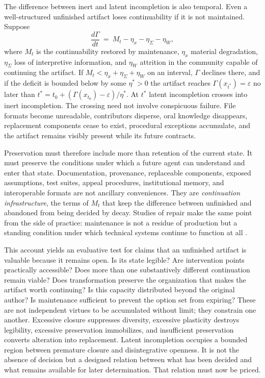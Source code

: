 The difference between inert and latent incompletion is also temporal. Even a well-structured unfinished artifact loses continuability if it is not maintained. Suppose
\begin{equation}\label{eq:decay}
\frac{d\Gamma}{dt}\ =\ M_t-\eta_x-\eta_\Sigma-\eta_W,
\end{equation}
where $M_t$ is the continuability restored by maintenance, $\eta_x$ material degradation, $\eta_\Sigma$ loss of interpretive information, and $\eta_W$ attrition in the community capable of continuing the artifact. If $M_t<\eta_x+\eta_\Sigma+\eta_W$ on an interval, $\Gamma$ declines there, and if the deficit is bounded below by some $\eta^\ast>0$ the artifact reaches $\Gamma(x_{t^\ast})=\varepsilon$ no later than $t^\ast=t_0+(\Gamma(x_{t_0})-\varepsilon)/\eta^\ast$. At $t^\ast$ latent incompletion crosses into inert incompletion. The crossing need not involve conspicuous failure. File formats become unreadable, contributors disperse, oral knowledge disappears, replacement components cease to exist, procedural exceptions accumulate, and the artifact remains visibly present while its future contracts.

Preservation must therefore include more than retention of the current state. It must preserve the conditions under which a future agent can understand and enter that state. Documentation, provenance, replaceable components, exposed assumptions, test suites, appeal procedures, institutional memory, and interoperable formats are not ancillary conveniences. They are \emph{continuation infrastructure}, the terms of $M_t$ that keep the difference between unfinished and abandoned from being decided by decay. Studies of repair make the same point from the side of practice: maintenance is not a residue of production but a standing condition under which technical systems continue to function at all \cite{jackson2014}.

This account yields an evaluative test for claims that an unfinished artifact is valuable because it remains open. Is its state legible? Are intervention points practically accessible? Does more than one substantively different continuation remain viable? Does transformation preserve the organization that makes the artifact worth continuing? Is this capacity distributed beyond the original author? Is maintenance sufficient to prevent the option set from expiring? These are not independent virtues to be accumulated without limit; they constrain one another. Excessive closure suppresses diversity, excessive plasticity destroys legibility, excessive preservation immobilizes, and insufficient preservation converts alteration into replacement. Latent incompletion occupies a bounded region between premature closure and disintegrative openness. It is not the absence of decision but a designed relation between what has been decided and what remains available for later determination. That relation must now be priced.

